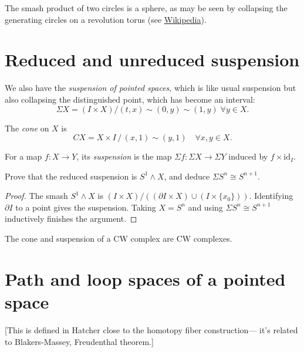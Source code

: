 \begin{example}
\label{example-basic-example}
	The smash product of two circles is a
	sphere, as may be seen by collapsing the
	generating circles on a revolution torus
	(see
	\href{https://en.wikipedia.org/wiki/%
	Smash_product#/media/File:
	Visualization_of_the_smash_product_of_%
	two_circles.gif}{Wikipedia}).
\end{example}

\section{Reduced and unreduced suspension}
\label{section-reduc-unred-suspe}
We also have the {\it suspension of pointed
spaces}, which is like usual suspension but
also collapsing the distinguished point,
which has become an interval:
$$\Sigma X=(I\times X)/(t,x)\sim (0,y)\sim
(1,y)\;\forall y\in X.$$

The \emph{cone} on $X$ is
$$
CX = X\times I\,/\,(x,1)\sim(y,1)
\quad\forall x,y\in X.
$$

\begin{definition}
\label{definition-suspension-map}
\label{fsusp}
For a map $f:X\to Y$, its
\emph{suspension} is the map
$\Sigma f:\Sigma X\to\Sigma Y$
induced by $f\times\mathrm{id}_I$.
\end{definition}

\begin{exercise}
Prove that the reduced suspension is
$S^1\wedge X$, and deduce
$\Sigma S^n\cong S^{n+1}$.
\end{exercise}

\begin{proof}
The smash $S^1\wedge X$ is
$(I\times X)/((\partial I\times X)\cup
(I\times\{x_0\}))$.
Identifying $\partial I$ to a point gives
the suspension.  Taking $X=S^n$ and using
$\Sigma S^n\cong S^{n+1}$ inductively
finishes the argument.
\end{proof}

\begin{theorem}
The cone and suspension of a CW complex
are CW complexes.
\end{theorem}

\section{Path and loop spaces of a pointed
space}
\label{section-path-loop-space-point-space}
[This is defined in Hatcher close to the
homotopy fiber construction--- it's related
to Blakers-Massey, Freudenthal theorem.]

